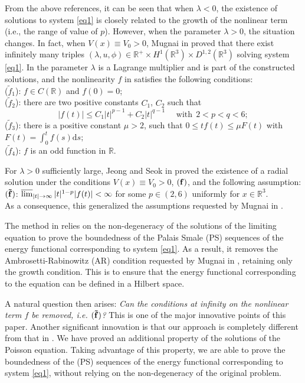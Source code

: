 \documentclass[12pt]{amsart}
\numberwithin{equation}{section}
\theoremstyle{definition}
\begin{document}
From the above references, it can be seen that when $\lambda<0$, the existence of solutions to  system \eqref{eq1} is closely related to the growth of the nonlinear term (i.e., the range of value of $p$). However, when the parameter $\lambda > 0$, the situation changes. In fact, when $V(x)\equiv V_0>0$, Mugnai in \cite{MR2810583} proved that there exist infinitely many triples $(\lambda,u,\phi)\in\mathbb{R}^+\times H^1(\mathbb{R}^3)\times D^{1,2}(\mathbb{R}^3)$ solving system \eqref{eq1}. 
In \cite{MR2810583} the parameter $\lambda$ is a Lagrange multiplier and is part of the constructed solutions, 
and the nonlinearity $f$ in \cite{MR2810583} satisfies the following conditions:\\
({\bf $\tilde f_{1}$}): $f\in C(\mathbb{R})$ and $f(0)=0$;\\
({\bf $\tilde f_{2}$}): there are two positive constants $C_1$, $C_2$ such that $$|f(t)|\leq C_{1}|t|^{p-1}+C_{2}|t|^{q-1} \quad\text{ with}\ \ 2<p<q<6;$$
({\bf $\tilde f_{3}$}): there is a positive constant $\mu>2$,  such that $0\leq tf(t)\leq\mu F(t)$ with $F(t)=\displaystyle{\int_{0}^tf(s)}\text{d}s;$\\
({\bf $\tilde f_{4}$}): $f$ is an odd function in $\mathbb R$.

For $\lambda>0$ sufficiently large, Jeong and Seok in \cite{MR3148130} proved the existence of a radial solution under the conditions $V(x)\equiv V_0>0$, $({\bf f})$, and the following assumption:\\
${\bf (\tilde f)}$:
    $\varlimsup_{|t|\to\infty}|t|^{1-p}|f(t)|< \infty$ for some $p\in(2,6)$ uniformly for $x\in\mathbb{R}^3$.\\
As a consequence, this generalized the assumptions requested
by Mugnai in \cite{MR2810583}.

The method in \cite{MR3148130} relies on the non-degeneracy of the solutions of the limiting equation to prove the boundedness of the Palais Smale (PS) sequences of the energy functional  corresponding to system \eqref{eq1}. As a result, it removes the Ambrosetti-Rabinowitz (AR) condition requested by Mugnai in \cite{MR2810583}, retaining only the growth condition. This is to ensure that the energy functional  corresponding to the equation can be defined in a Hilbert space.

A natural question then arises: {\it Can the conditions at infinity on the nonlinear term $f$ be removed, i.e. ${\bf (\tilde f)}$?} This is one of the major innovative points of this paper. Another significant innovation is that our approach is completely different from that in  \cite{MR3148130}. We have proved an additional property of the solutions of the Poisson equation. Taking advantage of this property, we are able to prove the boundedness of the (PS) sequences of the energy functional corresponding to system \eqref{eq1}, without relying on the non-degeneracy of the original problem.
\end{document}
